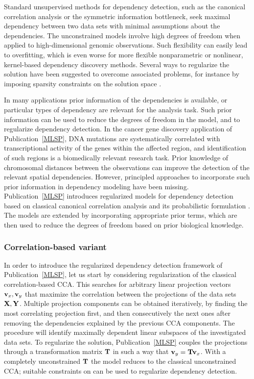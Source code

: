 
Standard unsupervised methods for dependency detection, such as the
canonical correlation analysis or the symmetric information bottleneck,
seek maximal dependency between two data sets with minimal assumptions
about the dependencies. The unconstrained models involve high degrees
of freedom when applied to high-dimensional genomic observations. Such
flexibility can easily lead to overfitting, which is even worse for
more flexible nonparametric or nonlinear, kernel-based dependency
discovery methods.  Several ways to regularize the solution have been
suggested to overcome associated problems, for instance by imposing
sparsity constraints on the solution space \citep{Bie03, Vinod76}.

In many applications prior information of the dependencies is
available, or particular types of dependency are relevant for the
analysis task. Such prior information can be used to reduce the
degrees of freedom in the model, and to regularize dependency
detection. In the cancer gene discovery application of
Publication~\ref{MLSP}, DNA mutations are systematically correlated
with transcriptional activity of the genes within the affected region,
and identification of such regions is a biomedically relevant research
task. Prior knowledge of chromosomal distances between the
observations can improve the detection of the relevant spatial
dependencies. However, principled approaches to incorporate such prior
information in dependency modeling have been
missing. Publication~\ref{MLSP} introduces regularized models for
dependency detection based on classical canonical correlation analysis
\citep{Hotelling36} and its probabilistic formulation
\citep{Bach05}. The models are extended by incorporating appropriate
prior terms, which are then used to reduce the degrees of freedom
based on prior biological knowledge.


\subsubsection{Correlation-based variant}

In order to introduce the regularized dependency detection framework
of Publication~\ref{MLSP}, let us start by considering regularization
of the classical correlation-based CCA. This searches for arbitrary
linear projection vectors \(\mathbf{v}_x, \mathbf{v}_y\) that maximize the correlation
between the projections of the data sets \(\mathbf{X}, \mathbf{Y}\). Multiple
projection components can be obtained iteratively, by finding the most
correlating projection first, and then consecutively the next ones
after removing the dependencies explained by the previous CCA
components. The procedure will identify maximally dependent linear
subspaces of the investigated data sets. To regularize the solution,
Publication~\ref{MLSP} couples the projections through a
transformation matrix \(\mathbf{T}\) in such a way that \(\mathbf{v}_y = \mathbf{T} \mathbf{v}_x\). With
a completely unconstrained \(\mathbf{T}\) the model reduces to the classical
unconstrained CCA; suitable constraints on can be used to regularize
dependency detection.

